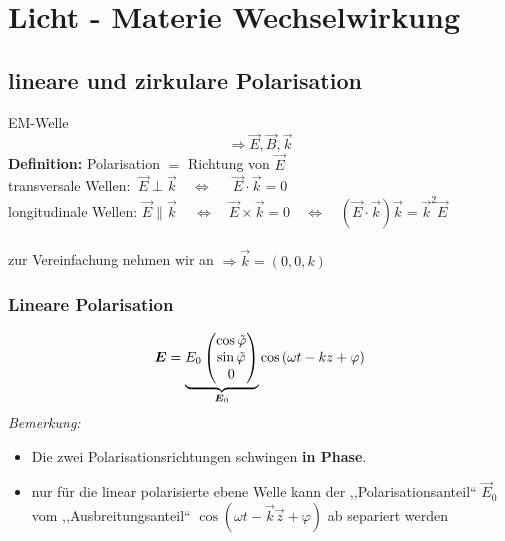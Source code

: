 \chapter{Licht - Materie Wechselwirkung}

\section{lineare und zirkulare Polarisation}

EM-Welle
\begin{equation*}
\Rightarrow \vec{E},\vec{B},\vec{k}
\end{equation*}
\textbf{Definition: } Polarisation $ \widehat{=} $ Richtung von $ \vec{E} $\\
transversale Wellen: $ \ \vec{E} \perp \vec{k} \quad \Leftrightarrow \quad \ \: \vec{E} \cdot \vec{k} = 0 $\\
longitudinale Wellen: $ \vec{E} \parallel \vec{k} \, \quad \Leftrightarrow \quad \vec{E} \times \vec{k} = 0 \quad \Leftrightarrow \quad \left(\vec{E} \cdot \vec{k}\right) \vec{k} = \vec{k}^2 \vec{E} $\\
\\
zur Vereinfachung nehmen wir an $ \Rightarrow \vec{k} = (0,0,k) $

\subsection{Lineare Polarisation}

\begin{equation*}
\boldsymbol{E} = \underbrace{E_0 \begin{pmatrix}
\cos \tilde{\varphi} \\ \sin \tilde{\varphi} \\ 0
\end{pmatrix}}_{\boldsymbol{E}_0} \cos \left(\omega t - k z + \varphi \right)
\end{equation*}
\emph{Bemerkung:}
\begin{itemize}
	\item Die zwei Polarisationsrichtungen schwingen \textbf{in Phase}.
	\item nur für die linear polarisierte ebene Welle kann der ,,Polarisationsanteil`` $ \vec{E}_0 $ vom ,,Ausbreitungsanteil`` $ \cos (\omega t - \vec{k} \vec{z} + \varphi) $ ab separiert werden
\end{itemize}

